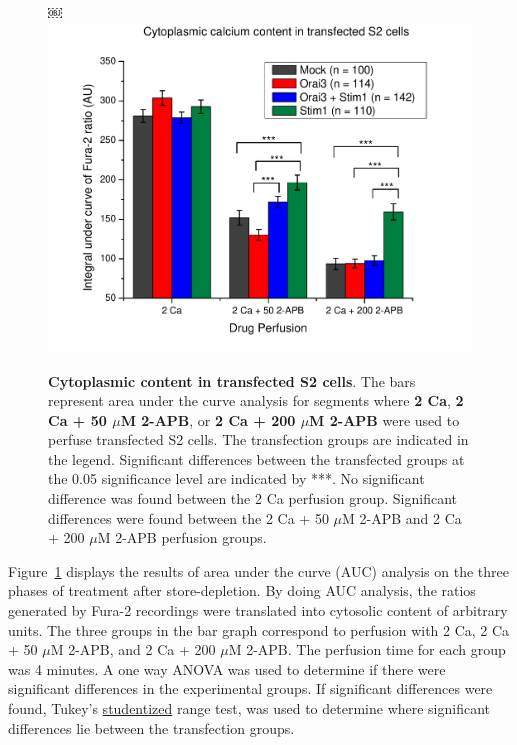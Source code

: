 \newpage

\begin{figure}[htbp]
\begin{center}
￼\includegraphics[clip, trim = 0 0 25mm 20mm, scale=0.6]{Figures/s2_drug_bar}
\caption[Cytoplasmic \Ca{} content in transfected S2 cells]{{\bfseries Cytoplasmic \Ca{} content in transfected S2 cells}. 
The bars represent area under the curve analysis for segments where {\bfseries 2 Ca}, {\bfseries 2 Ca + 50 $\mu$M 2-APB}, or {\bfseries 2 Ca + 200 $\mu$M 2-APB} were used to perfuse transfected S2 cells. The transfection groups are indicated in the legend. Significant differences between the transfected groups at the 0.05 significance level are indicated by ***. No significant difference was found between the 2 Ca perfusion group. Significant differences were found between the 2 Ca + 50 $\mu$M 2-APB and 2 Ca + 200 $\mu$M 2-APB perfusion groups.}
\label{fig:s2_2apb_bar}
\end{center}
\end{figure}

Figure~\ref{fig:s2_2apb_bar} displays the results of area under the curve (AUC) analysis on the three phases of treatment after store-depletion. By doing AUC analysis, the ratios generated by Fura-2 recordings were translated into cytosolic \Ca{} content of arbitrary units. The three groups in the bar graph correspond to perfusion with 2 Ca, 2 Ca + 50 $\mu$M 2-APB, and 2 Ca + 200 $\mu$M 2-APB. The perfusion time for each group was 4 minutes. A one way ANOVA was used to determine if there were significant differences in the experimental groups. If significant differences were found, Tukey's \underline{studentized} range test, was used to determine where significant differences lie between the transfection groups.  

